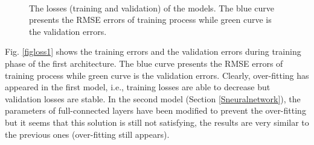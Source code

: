 \documentclass[review]{elsarticle}
\begin{document}
\begin{figure}[htbp]
    \centering
    ~~
\\    
    \caption{The losses (training and validation) of the models. The blue curve presents the RMSE errors of training process while green curve is the validation errors.}
    \label{figlosses}
\end{figure}
Fig. \ref{figloss1} shows the training errors and the validation errors during training phase of the first architecture. The blue curve presents the RMSE errors of training process while green curve is the validation errors. Clearly, over-fitting has appeared in the first model, i.e., training losses are able to decrease but validation losses are stable. In the second model (Section \ref{Sneuralnetwork}), the parameters of full-connected layers have been modified to prevent the over-fitting but it seems that this solution is still not satisfying, the results are very similar to the previous ones (over-fitting still appears).
\end{document}
